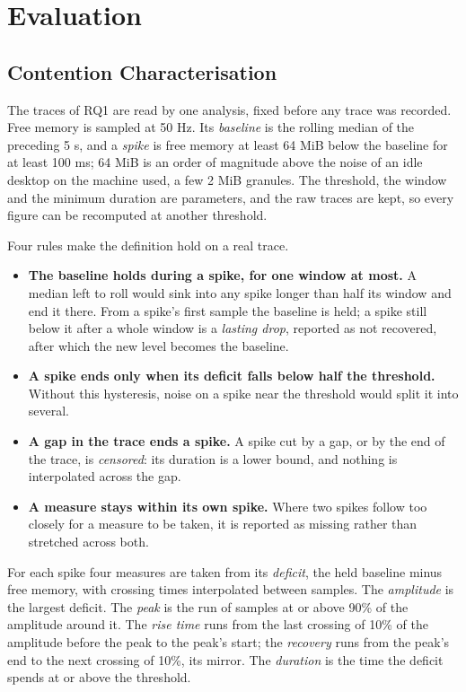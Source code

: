 \documentclass[11pt]{article}
\begin{document}
\section{Evaluation}
\label{sec:evaluation}

\subsection{Contention Characterisation}
\label{sec:spikes}
The traces of RQ1 are read by one analysis, fixed before any trace was
recorded. Free memory is sampled at 50 Hz. Its \textit{baseline} is the rolling
median of the preceding 5 s, and a \textit{spike} is free memory at least
64 MiB below the baseline for at least 100 ms; 64 MiB is an order of magnitude
above the noise of an idle desktop on the machine used, a few 2 MiB granules.
The threshold, the window and the minimum duration are parameters, and the raw
traces are kept, so every figure can be recomputed at another threshold.

Four rules make the definition hold on a real trace.
\begin{itemize}
\item \textbf{The baseline holds during a spike, for one window at most.} A
median left to roll would sink into any spike longer than half its window and
end it there. From a spike's first sample the baseline is held; a spike still
below it after a whole window is a \textit{lasting drop}, reported as not
recovered, after which the new level becomes the baseline.
\item \textbf{A spike ends only when its deficit falls below half the
threshold.} Without this hysteresis, noise on a spike near the threshold would
split it into several.
\item \textbf{A gap in the trace ends a spike.} A spike cut by a gap, or by the
end of the trace, is \textit{censored}: its duration is a lower bound, and
nothing is interpolated across the gap.
\item \textbf{A measure stays within its own spike.} Where two spikes follow too
closely for a measure to be taken, it is reported as missing rather than
stretched across both.
\end{itemize}

For each spike four measures are taken from its \textit{deficit}, the held
baseline minus free memory, with crossing times interpolated between samples.
The \textit{amplitude} is the largest deficit. The \textit{peak} is the run of
samples at or above 90\% of the amplitude around it. The \textit{rise time} runs
from the last crossing of 10\% of the amplitude before the peak to the peak's
start; the \textit{recovery} runs from the peak's end to the next crossing of
10\%, its mirror. The \textit{duration} is the time the deficit spends at or
above the threshold.
\end{document}
